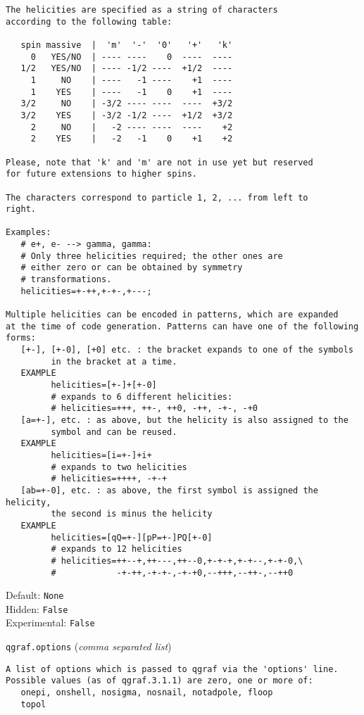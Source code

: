 \begin{basedescript}{\desclabelstyle{\pushlabel}}
\begin{verbatim}
The helicities are specified as a string of characters
according to the following table:

   spin massive  |  'm'  '-'  '0'   '+'   'k'
     0   YES/NO  | ---- ----    0  ----  ----
   1/2   YES/NO  | ---- -1/2 ----  +1/2  ----
     1     NO    | ----   -1 ----    +1  ----
     1    YES    | ----   -1    0    +1  ----
   3/2     NO    | -3/2 ---- ----  ----  +3/2
   3/2    YES    | -3/2 -1/2 ----  +1/2  +3/2
     2     NO    |   -2 ---- ----  ----    +2
     2    YES    |   -2   -1    0    +1    +2

Please, note that 'k' and 'm' are not in use yet but reserved
for future extensions to higher spins.

The characters correspond to particle 1, 2, ... from left to
right.

Examples:
   # e+, e- --> gamma, gamma:
   # Only three helicities required; the other ones are
   # either zero or can be obtained by symmetry
   # transformations.
   helicities=+-++,+-+-,+---;

Multiple helicities can be encoded in patterns, which are expanded
at the time of code generation. Patterns can have one of the following
forms:
   [+-], [+-0], [+0] etc. : the bracket expands to one of the symbols
         in the bracket at a time.
   EXAMPLE
         helicities=[+-]+[+-0]
         # expands to 6 different helicities:
         # helicities=+++, ++-, ++0, -++, -+-, -+0
   [a=+-], etc. : as above, but the helicity is also assigned to the
         symbol and can be reused.
   EXAMPLE
         helicities=[i=+-]+i+
         # expands to two helicities
         # helicities=++++, -+-+
   [ab=+-0], etc. : as above, the first symbol is assigned the helicity,
         the second is minus the helicity
   EXAMPLE
         helicities=[qQ=+-][pP=+-]PQ[+-0]
         # expands to 12 helicities
         # helicities=++--+,++---,++--0,+-+-+,+-+--,+-+-0,\
         #            -+-++,-+-+-,-+-+0,--+++,--++-,--++0
\end{verbatim}
Default: \verb|None|
\\Hidden: \verb|False|
\\Experimental: \verb|False|
\\\item[\colorbox{gray!30}{\texttt{qgraf.options}}] (\textit{comma separated list})
\begin{verbatim}
A list of options which is passed to qgraf via the 'options' line.
Possible values (as of qgraf.3.1.1) are zero, one or more of:
   onepi, onshell, nosigma, nosnail, notadpole, floop
   topol


\end{verbatim}
\end{basedescript}
